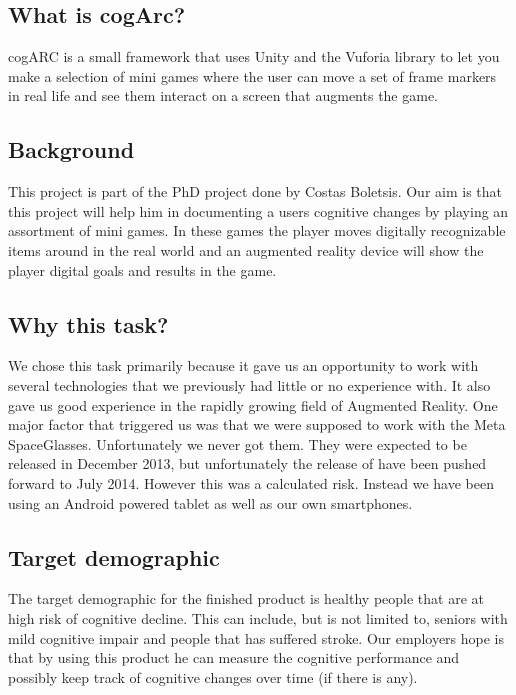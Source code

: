 \subsection{What is cogArc?}
\label{subsec:what_is_cogarc}
cogARC is a small framework that uses Unity and the Vuforia library to let you make a selection of mini games where the user can move a set of frame markers in real life and see them interact on a screen that augments the game.

\subsection{Background}
\label{subsec:background}
This project is part of the PhD project done by Costas Boletsis. Our aim is that this project will help him in documenting a users cognitive changes by playing an assortment of mini games. In these games the player moves digitally recognizable items around in the real world and an augmented reality device will show the player digital goals and results in the game. 

\subsection{Why this task?}
\label{subsec:why_this_task}
We chose this task primarily because it gave us an opportunity to work with several technologies that we previously had little or no experience with.
It also gave us good experience in the rapidly growing field of \gls{Augmented Reality}. 
One major factor that triggered us was that we were supposed to work with the 
\gls{Meta SpaceGlasses}. Unfortunately we never got them. They were expected to be released in December
 2013, but unfortunately the release of have been pushed forward to July 2014.
 However this was a calculated risk. Instead we have been using an Android powered tablet as well as our own smartphones.

\subsection{Target demographic}
\label{subsec:target_demographic}
The target demographic for the finished product is healthy people that are at high risk of cognitive decline. This can include, but is not limited to, seniors with mild cognitive impair and people that has suffered stroke.
Our employers hope is that by using this product he can measure the cognitive performance and possibly keep track of cognitive changes over time (if there is any).

